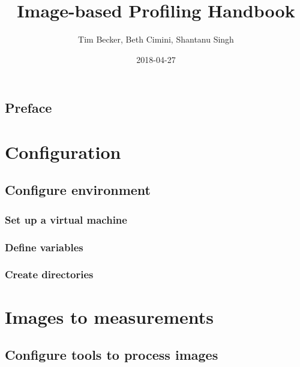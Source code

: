 \documentclass[]{book}
\title{Image-based Profiling Handbook}
\author{Tim Becker, Beth Cimini, Shantanu Singh}
\date{2018-04-27}
\begin{document}
\maketitle

{
\setcounter{tocdepth}{1}
\tableofcontents
}
\hypertarget{preface}{%
\chapter*{Preface}\label{preface}}

\hypertarget{part-configuration}{%
\part{Configuration}\label{part-configuration}}

\hypertarget{configure-environment}{%
\chapter{Configure environment}\label{configure-environment}}

\hypertarget{set-up-a-virtual-machine}{%
\section{Set up a virtual machine}\label{set-up-a-virtual-machine}}

\hypertarget{define-variables}{%
\section{Define variables}\label{define-variables}}

\hypertarget{create-directories}{%
\section{Create directories}\label{create-directories}}

\hypertarget{part-images-to-measurements}{%
\part{Images to
measurements}\label{part-images-to-measurements}}

\hypertarget{configure-tools-to-process-images}{%
\chapter{Configure tools to process
images}\label{configure-tools-to-process-images}}
\end{document}
